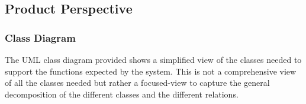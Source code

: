 
\subsection{Product Perspective}

%
%
%
%
%
%
%
%

\subsubsection{Class Diagram}
The UML class diagram provided shows a simplified view of the classes needed to support the functions expected by the system. This is not a comprehensive view of all the classes needed but rather a focused-view to capture the general decomposition of the different classes and the different relations.

